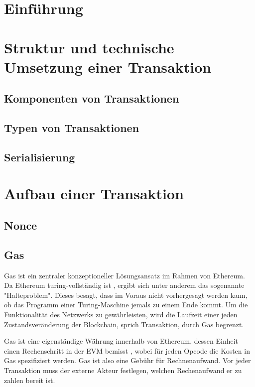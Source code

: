 \documentclass{llncs}
\begin{document}
\section{Einführung}
% 

\section{Struktur und technische Umsetzung einer Transaktion}
\subsection{Komponenten von Transaktionen}
\subsection{Typen von Transaktionen}
\subsection{Serialisierung}

\section{Aufbau einer Transaktion}

\subsection{Nonce}

\subsection{Gas}

Gas ist ein zentraler konzeptioneller Lösungsansatz im Rahmen von Ethereum. Da Ethereum turing-vollständig ist \cite[S. 1]{wood_ethereum/yellowpaper_2019}, ergibt sich unter anderem das sogenannte "Halteproblem". Dieses besagt, dass im Voraus nicht vorhergesagt werden kann, ob das Programm einer Turing-Maschine jemals zu einem Ende kommt. \cite[S.70]{davis_computability_2013} Um die Funktionalität des Netzwerks zu gewährleisten, wird die Laufzeit einer jeden Zustandsveränderung der Blockchain, sprich Transaktion, durch Gas begrenzt.

Gas ist eine eigenständige Währung innerhalb von Ethereum, dessen Einheit einen Rechenschritt in der EVM bemisst \cite[S. 9:3]{m.spain_oasics-tokeneconomics_2019}, wobei für jeden Opcode die Kosten in Gas spezifiziert werden. \cite[S. 25 ff.]{wood_ethereum/yellowpaper_2019} Gas ist also eine Gebühr für Rechnenaufwand. Vor jeder Transaktion muss der externe Akteur festlegen, welchen Rechenaufwand er zu zahlen bereit ist.
\end{document}
